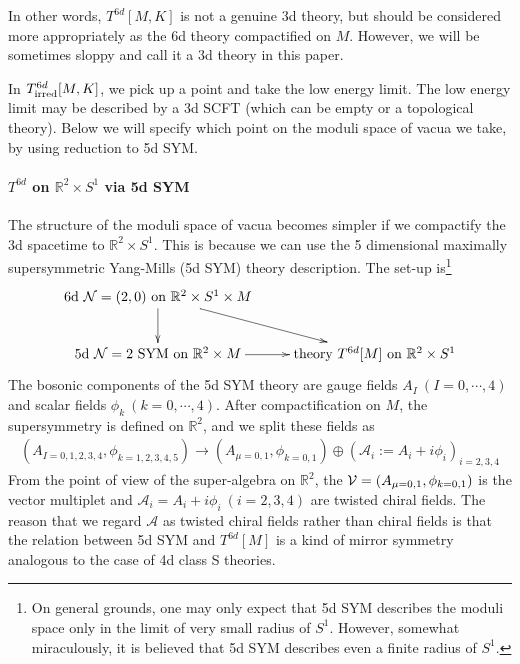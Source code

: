 \documentclass[a4paper,11pt]{article}
\def\cA{\mathcal{A}}
\def\cN{\mathcal{N}}
\def\bR{\mathbb{R}}
\def\BR{{\mathbb R}}
\begin{document}
In other words, $T^{6d}[M,K]$ is not a genuine 3d theory, but should be considered more appropriately as
the 6d theory compactified on $M$. However, we will be sometimes sloppy and call it a 3d theory in this paper.

In $T^{6d}_{\rm irred}[M,K]$, we pick up a point and take the low energy limit. 
The low energy limit may be described by a 3d SCFT (which can be empty or a topological theory). 
Below we will specify which point on the moduli space of vacua we take, by using reduction to 5d SYM.

\paragraph{$T^{6d}$ on $\mathbb{R}^2\times S^1$ via 5d SYM} 
The structure of the moduli space of vacua becomes simpler if we compactify the 3d spacetime to $\BR^2 \times S^1$.
This is because we can use the 5 dimensional maximally supersymmetric Yang-Mills (5d SYM)  theory description.
The set-up is\footnote{On general grounds, one may only expect that 5d SYM describes the moduli space only in the limit of very small radius of $S^1$.
However, somewhat miraculously, it is believed that 5d SYM describes even a finite radius of $S^1$.}
%
\begin{equation}
\xymatrix{
\text{6d }\cN=(2,0)\text{ on }\mathbb{R}^2 \times S^1 \times M   \ar[d] \ar[dr]  &   \\
\text{5d }\cN=2\text{ SYM on } \mathbb{R}^2 \times M \ar[r] & \text{theory }T^{6d}[M] \text{ on }\mathbb{R}^2 \times S^1
}\label{eq:comm}
\end{equation}
%
The bosonic components of the 5d SYM theory are gauge fields $A_{I}~(I=0,\cdots,4)$ and scalar fields $\phi_k~(k=0,\cdots,4)$.
After compactification on $M$, the supersymmetry is defined on $\bR^2$, and we split these fields as
%
\begin{align}
(A_{I=0,1,2,3,4}, \phi_{k=1,2,3,4,5}) \to (A_{\mu=0,1}, \phi_{k=0,1}) \oplus ( \cA_i :=A_{i} + i \phi_{i} )_{i=2,3,4}
\end{align}
%
From the point of view of the super-algebra on $\BR^2$,
the ${\cal V}= (A_{\mu=0,1}, \phi_{k=0,1})$ is the vector multiplet and $\cA_i=A_{i} + i \phi_{i}~(i=2,3,4)$ are twisted chiral fields.
The reason that we regard $\cA$ as twisted chiral fields rather than chiral fields is that the relation between 5d SYM and $T^{6d}[M]$ is a kind of mirror symmetry
analogous to the case of 4d class S theories.
\end{document}

